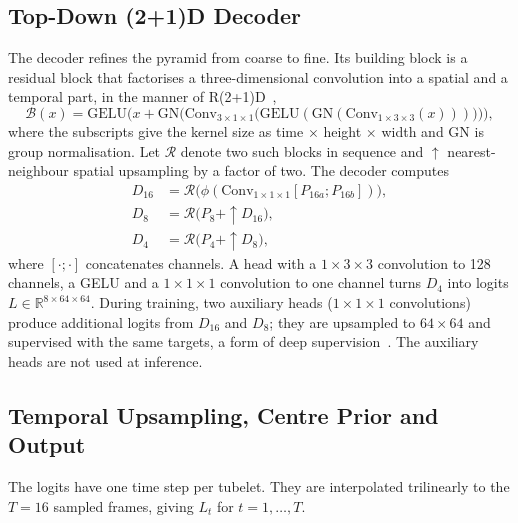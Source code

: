 \subsection{Top-Down (2+1)D Decoder}

The decoder refines the pyramid from coarse to fine. Its building block is
a residual block that factorises a three-dimensional convolution into a
spatial and a temporal part, in the manner of R(2+1)D~\cite{tran2018closer},
\begin{equation}
  \mathcal{B}(x) = \mathrm{GELU}\!\Big(x + \mathrm{GN}\big(\mathrm{Conv}_{3\times1\times1}
  \big(\mathrm{GELU}(\mathrm{GN}(\mathrm{Conv}_{1\times3\times3}(x)))\big)\big)\Big),
  \label{eq:r21}
\end{equation}
where the subscripts give the kernel size as time $\times$ height $\times$
width and $\mathrm{GN}$ is group normalisation. Let $\mathcal{R}$ denote two
such blocks in sequence and ${\uparrow}$ nearest-neighbour spatial upsampling
by a factor of two. The decoder computes
\begin{equation}
\begin{aligned}
  D_{16} &= \mathcal{R}\big(\phi(\mathrm{Conv}_{1\times1\times1}[P_{16a};P_{16b}])\big),\\
  D_{8} &= \mathcal{R}\big(P_{8} + {\uparrow}D_{16}\big),\\
  D_{4} &= \mathcal{R}\big(P_{4} + {\uparrow}D_{8}\big),
\end{aligned}
\label{eq:decoder}
\end{equation}
where $[\cdot;\cdot]$ concatenates channels. A head with a $1\times3\times3$
convolution to 128 channels, a \acrshort{GELU} and a $1\times1\times1$ convolution to one
channel turns $D_4$ into logits $L\in\mathbb{R}^{8\times64\times64}$. During
training, two auxiliary heads ($1\times1\times1$ convolutions) produce
additional logits from $D_{16}$ and $D_8$; they are upsampled to
$64\times64$ and supervised with the same targets, a form of deep
supervision~\cite{lee2015deeply}. The auxiliary heads are not used at
inference.

\subsection{Temporal Upsampling, Centre Prior and Output}

The logits have one time step per tubelet. They are interpolated trilinearly
to the $T=16$ sampled frames, giving $L_t$ for $t=1,\dots,T$.

